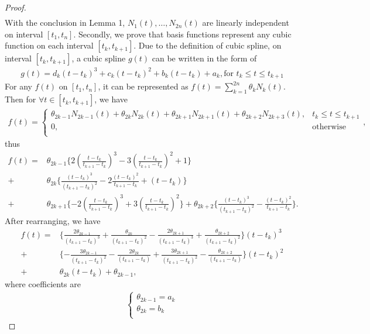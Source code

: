 \begin{proof}
\begin{align*}
\end{align*}
With the conclusion in Lemma 1, $N_1(t),\ldots,N_{2n}(t)$  are linearly independent on interval $[t_1, t_n]$.
Secondly, we prove that basis functions represent any cubic function on each interval $[t_k, t_{k+1}]$. Due to the definition of cubic spline, on interval $[t_k, t_{k+1}]$, a cubic spline $g(t)$ can be written in the form of
\begin{eqnarray}
g(t)=d_k (t-t_k)^3+c_k(t-t_k)^2+b_k(t-t_k)+a_k, \mbox{for $t_k \leq t \leq t_{k+1}$}
\end{eqnarray}
For any $f(t)$ on $[t_1, t_n]$, it can be represented as $f(t)=\sum_{k=1}^{2n} \theta_k N_k(t)$. Then for $\forall t \in [t_k,t_{k+1}]$, we have
\begin{align*}
f(t)=\begin{cases}
\theta_{2k-1}N_{2k-1}(t)+\theta_{2k}N_{2k}(t)+\theta_{2k+1}N_{2k+1}(t)+\theta_{2k+2}N_{2k+3}(t), & t_k \leq t \leq t_{k+1}  \\
0, & \mbox{otherwise}\\
\end{cases},
\end{align*}
thus
\begin{align*}
f(t)=&\theta_{2k-1}\{ 2(\frac{t-t_{k}}{t_{k+1}-t_{k}})^3-3(\frac{t-t_{k}}{t_{k+1}-t_{k}})^2+1  \} \\+&\theta_{2k} \{  \frac{(t-t_{k})^3}{(t_{k+1}-t_{k})^2}-2\frac{(t-t_{k})^2}{t_{k+1}-t_{k}}+(t-t_{k}) \} \\
+&\theta_{2k+1} \{ -2(\frac{t-t_k}{t_{k+1}-t_k})^3+3(\frac{t-t_k}{t_{k+1}-t_k})^2  \}  +\theta_{2k+2} \{  \frac{(t-t_k)^3}{(t_{k+1}-t_k)^2}-\frac{(t-t_k)^2}{t_{k+1}-t_k} \}.
\end{align*}
After rearranging, we have
\begin{align*}
f(t)=& \{ \frac{2\theta_{2k-1}}{(t_{k+1}-t_{k})^3} +\frac{\theta_{2k}}{(t_{k+1}-t_{k})^2} -\frac{2\theta_{2k+1}}{(t_{k+1}-t_{k})^3} +\frac{\theta_{2k+2}}{(t_{k+1}-t_{k})^2} \} (t-t_k)^3 \\
+&  \{ -\frac{3\theta_{2k-1}}{(t_{k+1}-t_{k})^2} -\frac{2\theta_{2k}}{(t_{k+1}-t_{k})} +\frac{3\theta_{2k+1}}{(t_{k+1}-t_{k})^2} - \frac{\theta_{2k+2}}{(t_{k+1}-t_{k})} \} (t-t_k)^2 \\
+&  \theta_{2k} (t-t_k) +\theta_{2k-1},
\end{align*}
where coefficients are
\begin{align*}
\begin{cases}
\theta_{2k-1}=a_k\\
\theta_{2k}=b_k\\

\end{cases}
\end{align*}
\end{proof}
